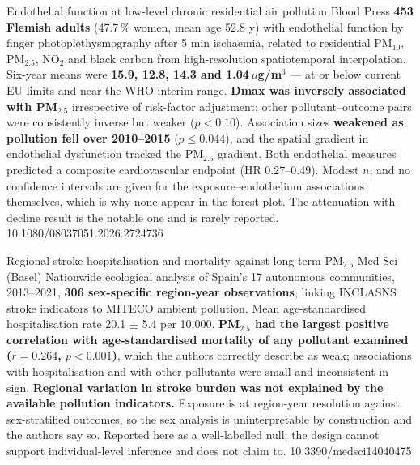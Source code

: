 \documentclass[10pt]{article}
\begin{document}
{Endothelial function at low-level chronic residential air pollution}
{Blood Press}
{\textbf{453 Flemish adults} (47.7\,\% women, mean age 52.8 y) with endothelial function
by finger photoplethysmography after 5 min ischaemia, related to residential PM$_{10}$,
PM$_{2.5}$, NO$_2$ and black carbon from high-resolution spatiotemporal interpolation.
Six-year means were \textbf{15.9, 12.8, 14.3 and 1.04\,$\mu$g/m$^3$} --- at or below
current EU limits and near the WHO interim range. \textbf{Dmax was inversely associated
with PM$_{2.5}$} irrespective of risk-factor adjustment; other pollutant--outcome pairs
were consistently inverse but weaker ($p < 0.10$). Association sizes \textbf{weakened as
pollution fell over 2010--2015} ($p \leq 0.044$), and the spatial gradient in endothelial
dysfunction tracked the PM$_{2.5}$ gradient. Both endothelial measures predicted a
composite cardiovascular endpoint (HR 0.27--0.49). Modest $n$, and no confidence intervals
are given for the exposure--endothelium associations themselves, which is why none appear
in the forest plot. The attenuation-with-decline result is the notable one and is rarely
reported.}
{10.1080/08037051.2026.2724736}

{Regional stroke hospitalisation and mortality against long-term PM$_{2.5}$}
{Med Sci (Basel)}
{Nationwide ecological analysis of Spain's 17 autonomous communities, 2013--2021,
\textbf{306 sex-specific region-year observations}, linking INCLASNS stroke indicators to
MITECO ambient pollution. Mean age-standardised hospitalisation rate 20.1 $\pm$ 5.4 per
10{,}000. \textbf{PM$_{2.5}$ had the largest positive correlation with age-standardised
mortality of any pollutant examined ($r = 0.264$, $p < 0.001$)}, which the authors
correctly describe as weak; associations with hospitalisation and with other pollutants
were small and inconsistent in sign. \textbf{Regional variation in stroke burden was not
explained by the available pollution indicators.} Exposure is at region-year resolution
against sex-stratified outcomes, so the sex analysis is uninterpretable by construction
and the authors say so. Reported here as a well-labelled null; the design cannot support
individual-level inference and does not claim to.}
{10.3390/medsci14040475}

\end{document}
